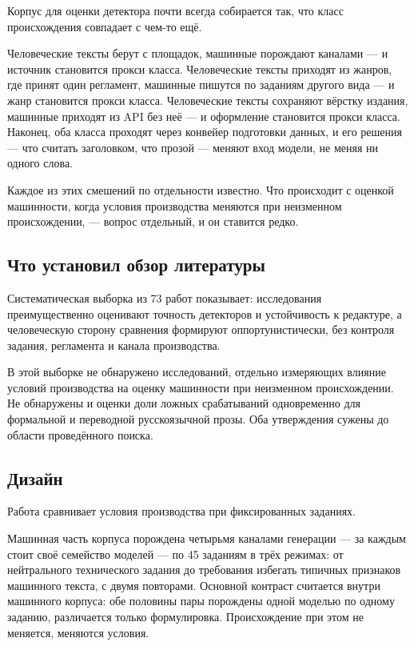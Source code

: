\documentclass[11pt,a4paper]{article}
\renewcommand{\_}{\textunderscore\allowbreak}
\begin{document}
Корпус для оценки детектора почти всегда собирается так, что класс происхождения
совпадает с чем-то ещё.

Человеческие тексты берут с площадок, машинные порождают каналами — и источник
становится прокси класса. Человеческие тексты приходят из жанров, где принят один
регламент, машинные пишутся по заданиям другого вида — и жанр становится прокси
класса. Человеческие тексты сохраняют вёрстку издания, машинные приходят из API
без неё — и оформление становится прокси класса. Наконец, оба класса проходят
через конвейер подготовки данных, и его решения — что считать заголовком, что
прозой — меняют вход модели, не меняя ни одного слова.

Каждое из этих смешений по отдельности известно. Что происходит с оценкой
машинности, когда условия производства меняются при неизменном происхождении, —
вопрос отдельный, и он ставится редко.

\subsection{Что установил обзор литературы}

Систематическая выборка из 73 работ показывает: исследования преимущественно
оценивают точность детекторов и устойчивость к редактуре, а человеческую сторону
сравнения формируют оппортунистически, без контроля задания, регламента и канала
производства.

В этой выборке не обнаружено исследований, отдельно измеряющих влияние условий
производства на оценку машинности при неизменном происхождении. Не обнаружены и
оценки доли ложных срабатываний одновременно для формальной и переводной
русскоязычной прозы. Оба утверждения сужены до области проведённого поиска.

\subsection{Дизайн}

Работа сравнивает условия производства при фиксированных заданиях.

Машинная часть корпуса порождена четырьмя каналами генерации — за каждым стоит
своё семейство моделей — по 45 заданиям в трёх режимах: от нейтрального
технического задания до требования избегать типичных признаков машинного
текста, с двумя повторами. Основной контраст считается внутри машинного корпуса: обе
половины пары порождены одной моделью по одному заданию, различается только
формулировка. Происхождение при этом не меняется, меняются условия.
\end{document}
